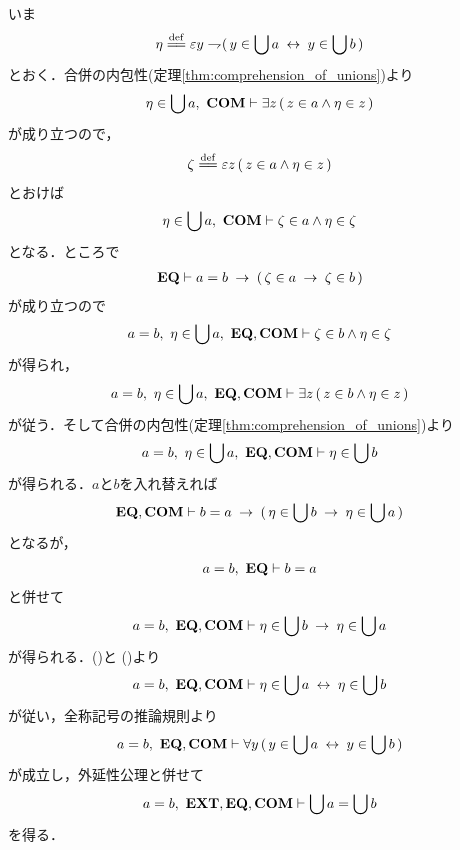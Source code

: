 	\begin{sketch}
		いま
		\begin{align}
			\eta \defeq \varepsilon y \negation (\, y \in \bigcup a 
			\lrarrow y \in \bigcup b\, )
		\end{align}
		とおく．合併の内包性(定理\ref{thm:comprehension_of_unions})より
		\begin{align}
			\eta \in \bigcup a,\ \mbox{\bf COM} \vdash
			\exists z\, (\, z \in a \wedge \eta \in z\, )
		\end{align}
		が成り立つので，
		\begin{align}
			\zeta \defeq \varepsilon z\, (\, z \in a \wedge \eta \in z\, )
		\end{align}
		とおけば
		\begin{align}
			\eta \in \bigcup a,\ \mbox{\bf COM} \vdash
			\zeta \in a \wedge \eta \in \zeta
		\end{align}
		となる．ところで
		\begin{align}
			\mbox{{\bf EQ}} \vdash a = b \hspace{0.25em}\rightarrow\hspace{0.25em} (\, \zeta \in a \hspace{0.25em}\rightarrow\hspace{0.25em} \zeta \in b\, )
		\end{align}
		が成り立つので
		\begin{align}
			a = b,\ \eta \in \bigcup a,\ \mbox{{\bf EQ}},\mbox{\bf COM} \vdash
			\zeta \in b \wedge \eta \in \zeta
		\end{align}
		が得られ，
		\begin{align}
			a = b,\ \eta \in \bigcup a,\ \mbox{{\bf EQ}},\mbox{\bf COM} \vdash
			\exists z\, (\, z \in b \wedge \eta \in z\, )
		\end{align}
		が従う．そして合併の内包性(定理\ref{thm:comprehension_of_unions})より
		\begin{align}
			a = b,\ \eta \in \bigcup a,\ \mbox{{\bf EQ}},\mbox{\bf COM} \vdash \eta \in \bigcup b
			\label{fom:unions_of_equal_classes_are_equal_1}
		\end{align}
		が得られる．$a$と$b$を入れ替えれば
		\begin{align}
			\mbox{{\bf EQ}},\mbox{\bf COM} \vdash 
			b = a \hspace{0.25em}\rightarrow\hspace{0.25em} (\, \eta \in \bigcup b \hspace{0.25em}\rightarrow\hspace{0.25em} \eta \in \bigcup a\, )
		\end{align}
		となるが，
		\begin{align}
			a = b,\ \mbox{{\bf EQ}} \vdash b = a 
		\end{align}
		と併せて
		\begin{align}
			a = b,\ \mbox{{\bf EQ}},\mbox{\bf COM} \vdash 
			\eta \in \bigcup b \hspace{0.25em}\rightarrow\hspace{0.25em} \eta \in \bigcup a
			\label{fom:unions_of_equal_classes_are_equal_2}
		\end{align}
		が得られる．()と
		()より
		\begin{align}
			a = b,\ \mbox{{\bf EQ}},\mbox{\bf COM} \vdash 
			\eta \in \bigcup a \hspace{0.25em}\leftrightarrow\hspace{0.25em} \eta \in \bigcup b
		\end{align}
		が従い，全称記号の推論規則より
		\begin{align}
			a = b,\ \mbox{{\bf EQ}},\mbox{\bf COM} \vdash 
			\forall y\, (\, y \in \bigcup a \hspace{0.25em}\leftrightarrow\hspace{0.25em} y \in \bigcup b\, )
		\end{align}
		が成立し，外延性公理と併せて
		\begin{align}
			a = b,\ \mbox{{\bf EXT}},\mbox{{\bf EQ}},\mbox{\bf COM} \vdash 
			\bigcup a = \bigcup b
		\end{align}
		を得る．
		\QED
	\end{sketch}
	
